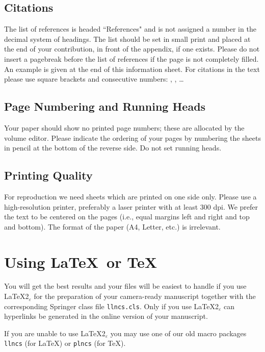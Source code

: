 \documentclass[a4paper]{llncs}
\begin{document}
\subsection{Citations}

The list of references is headed ``References" and is not assigned a
number
in the decimal system of headings. The list should be set in small print
and placed at the end of your contribution, in front of the appendix,
if one exists.
Please do not insert a pagebreak before the list of references if the
page is not completely filled.
An example is given at the
end of this information sheet. For citations in the text please use
square brackets and consecutive numbers: \cite{leeuw},
\cite{bru:car:pier}, \cite{mich} \dots

\subsection{Page Numbering and Running Heads}

Your paper should show no printed page numbers; these are allocated by
the volume editor. Please indicate the ordering of your pages by
numbering the sheets in pencil at the bottom of the
reverse side. Do not set running heads.

\subsection{Printing Quality}

For reproduction we need sheets which are printed on one side only.
Please use a high-resolution printer, preferably a laser printer
with at least 300 dpi. We prefer
the text to be centered on the pages (i.e., equal margins left and
right and top and bottom). The format of the paper (A4, Letter, etc.) is
irrelevant.


\section{Using \LaTeX\ or \TeX}
\label{sect:TeX}

You will get the best results and your files will be easiest to handle
if you use \LaTeX2$_\varepsilon$ for the preparation of your
camera-ready manuscript
together with the corresponding Springer class file
\verb+llncs.cls+. Only if you use \LaTeX2$_\varepsilon$ can
hyperlinks be generated in the online version of your manuscript.

If you are unable to use \LaTeX2$_\varepsilon$ you may use one of our
old macro packages \verb+llncs+ (for \LaTeX) or \verb+plncs+ (for \TeX).
\end{document}
